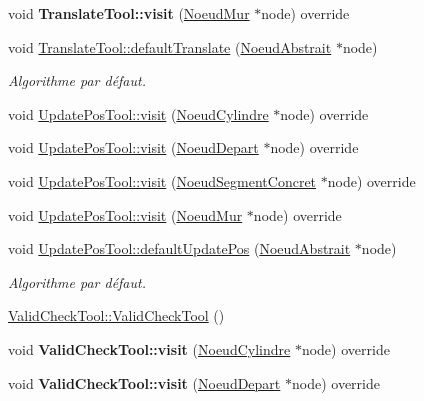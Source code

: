 \begin{DoxyCompactItemize}
\item 
\hypertarget{group__inf2990_ga7172d03575c6b5062c61753f8d0bce08}{void {\bfseries Translate\-Tool\-::visit} (\hyperlink{class_noeud_mur}{Noeud\-Mur} $\ast$node) override}\label{group__inf2990_ga7172d03575c6b5062c61753f8d0bce08}

\item 
void \hyperlink{group__inf2990_ga1e47597de16ebba1986441232607d6dc}{Translate\-Tool\-::default\-Translate} (\hyperlink{class_noeud_abstrait}{Noeud\-Abstrait} $\ast$node)
\begin{DoxyCompactList}\small\item\em Algorithme par défaut. \end{DoxyCompactList}\item 
void \hyperlink{group__inf2990_ga17c74b38bec464d0709cfa524956bc20}{Update\-Pos\-Tool\-::visit} (\hyperlink{class_noeud_cylindre}{Noeud\-Cylindre} $\ast$node) override
\item 
void \hyperlink{group__inf2990_gab2df0415f70228237a770a972d58fecd}{Update\-Pos\-Tool\-::visit} (\hyperlink{class_noeud_depart}{Noeud\-Depart} $\ast$node) override
\item 
void \hyperlink{group__inf2990_ga2c9d682bbe7b343d62a20878e1589a2a}{Update\-Pos\-Tool\-::visit} (\hyperlink{class_noeud_segment_concret}{Noeud\-Segment\-Concret} $\ast$node) override
\item 
void \hyperlink{group__inf2990_ga1314042a9c165f51305697d69b97d2e6}{Update\-Pos\-Tool\-::visit} (\hyperlink{class_noeud_mur}{Noeud\-Mur} $\ast$node) override
\item 
void \hyperlink{group__inf2990_ga272a909a88c8fa8f9f882834fd890398}{Update\-Pos\-Tool\-::default\-Update\-Pos} (\hyperlink{class_noeud_abstrait}{Noeud\-Abstrait} $\ast$node)
\begin{DoxyCompactList}\small\item\em Algorithme par défaut. \end{DoxyCompactList}\item 
\hyperlink{group__inf2990_ga4e827b025969ce7fa8204c6a62cf27c6}{Valid\-Check\-Tool\-::\-Valid\-Check\-Tool} ()
\item 
\hypertarget{group__inf2990_ga032c8fa96e75b6300ce0ad8692250c0c}{void {\bfseries Valid\-Check\-Tool\-::visit} (\hyperlink{class_noeud_cylindre}{Noeud\-Cylindre} $\ast$node) override}\label{group__inf2990_ga032c8fa96e75b6300ce0ad8692250c0c}

\item 
\hypertarget{group__inf2990_gab3f77ff9294703aa3b3806c505421136}{void {\bfseries Valid\-Check\-Tool\-::visit} (\hyperlink{class_noeud_depart}{Noeud\-Depart} $\ast$node) override}\label{group__inf2990_gab3f77ff9294703aa3b3806c505421136}


\end{DoxyCompactItemize}
